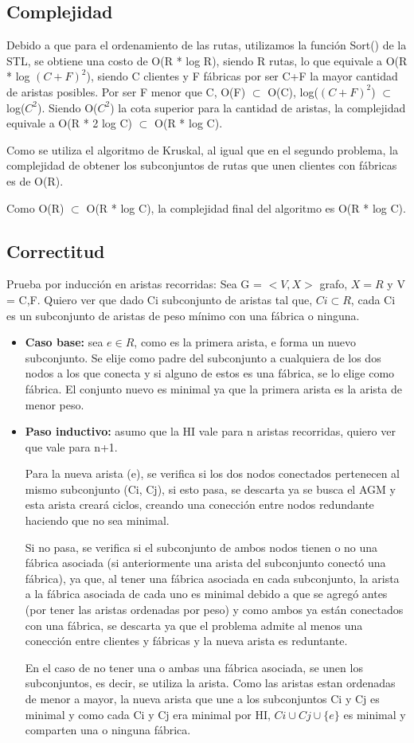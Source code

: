 \documentclass[a4paper, 10pt, twoside]{article}
\begin{document}
\subsection{Complejidad}
Debido a que para el ordenamiento de las rutas, utilizamos la función Sort() de la STL, se obtiene una costo de O(R * log R), siendo R rutas, lo que equivale a O(R * log $(C+F)^2$), siendo C clientes y F fábricas por ser C+F la mayor cantidad de aristas posibles. Por ser F menor que C, O(F) $\subset$ O(C), log($(C+F)^2$) $\subset$ log($C^2$). Siendo O($C^2$) la cota superior para la cantidad de aristas, la complejidad equivale a O(R * 2 log C) $\subset$ O(R * log C).

Como se utiliza el algoritmo de Kruskal, al igual que en el segundo problema, la complejidad de obtener los subconjuntos de rutas que unen clientes con fábricas es de O(R).

Como O(R) $\subset$ O(R * log C), la complejidad final del algoritmo es O(R * log C).
\subsection{Correctitud}
Prueba por inducción en aristas recorridas:
Sea G = $<V,X>$ grafo, $X = R$ y V = {C,F}. Quiero ver que dado Ci subconjunto de aristas tal que, $Ci \subset R$, cada Ci es un subconjunto de aristas de peso mínimo con una fábrica o ninguna. 
\begin{itemize}
	\item \textbf{Caso base:} sea $e \in R$, como es la primera arista, e forma un nuevo subconjunto. Se elije como padre del subconjunto a cualquiera de los  dos nodos a los que conecta y si alguno de estos es una fábrica, se lo elige como fábrica. El conjunto nuevo es minimal ya que la primera arista es la arista de menor peso.
	\item \textbf{Paso inductivo:} asumo que la HI vale para n aristas recorridas, quiero ver que vale para n+1.
	
Para la nueva arista (e), se verifica si los dos nodos conectados pertenecen al mismo subconjunto (Ci, Cj), si esto pasa, se descarta ya se busca el AGM y esta arista creará ciclos, creando una conección entre nodos redundante haciendo que no sea minimal.
	
Si no pasa, se verifica si el subconjunto de ambos nodos tienen o no una fábrica asociada (si anteriormente una arista del subconjunto conectó una fábrica), ya que, al tener una fábrica asociada en cada subconjunto, la arista a la fábrica asociada de cada uno es minimal debido a que se agregó antes (por tener las aristas ordenadas por peso) y como ambos ya están conectados con una fábrica, se descarta ya que el problema admite al menos una conección entre clientes y fábricas y la nueva arista es reduntante.

En el caso de no tener una o ambas una fábrica asociada, se unen los subconjuntos, es decir, se utiliza la arista. Como las aristas estan ordenadas de menor a mayor, la nueva arista que une a los subconjuntos Ci y Cj es minimal y como cada Ci y Cj era minimal por HI, $Ci \cup Cj \cup \{e\}$ es minimal y comparten una o ninguna fábrica.
\end{itemize}
\end{document}
